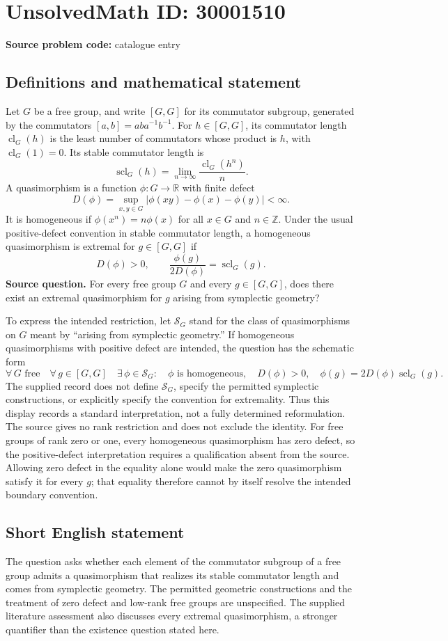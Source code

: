 \documentclass[11pt]{article}
\newcommand{\Z}{\mathbb{Z}}
\newcommand{\R}{\mathbb{R}}
\begin{document}
\section*{UnsolvedMath ID: 30001510}
\textbf{Source problem code:} catalogue entry
\subsection{Definitions and mathematical statement}
Let \(G\) be a free group, and write \([G,G]\) for its commutator subgroup, generated by the commutators \([a,b]=aba^{-1}b^{-1}\). For \(h\in[G,G]\), its commutator length \(\operatorname{cl}_G(h)\) is the least number of commutators whose product is \(h\), with \(\operatorname{cl}_G(1)=0\). Its stable commutator length is
\[
\operatorname{scl}_G(h)=\lim_{n\to\infty}\frac{\operatorname{cl}_G(h^n)}{n}.
\]
A quasimorphism is a function \(\phi:G\to\R\) with finite defect
\[
D(\phi)=\sup_{x,y\in G}|\phi(xy)-\phi(x)-\phi(y)|<\infty.
\]
It is homogeneous if \(\phi(x^n)=n\phi(x)\) for all \(x\in G\) and \(n\in\Z\). Under the usual positive-defect convention in stable commutator length, a homogeneous quasimorphism is extremal for \(g\in[G,G]\) if
\[
D(\phi)>0,\qquad \frac{\phi(g)}{2D(\phi)}=\operatorname{scl}_G(g).
\]
\textbf{Source question.} For every free group \(G\) and every \(g\in[G,G]\), does there exist an extremal quasimorphism for \(g\) arising from symplectic geometry?

To express the intended restriction, let \(\mathcal S_G\) stand for the class of quasimorphisms on \(G\) meant by ``arising from symplectic geometry.'' If homogeneous quasimorphisms with positive defect are intended, the question has the schematic form
\[
\forall\,G\text{ free}\quad\forall\,g\in[G,G]\quad
\exists\,\phi\in\mathcal S_G:\quad
\phi\text{ is homogeneous},\quad D(\phi)>0,\quad
\phi(g)=2D(\phi)\operatorname{scl}_G(g).
\]
The supplied record does not define \(\mathcal S_G\), specify the permitted symplectic constructions, or explicitly specify the convention for extremality. Thus this display records a standard interpretation, not a fully determined reformulation. The source gives no rank restriction and does not exclude the identity. For free groups of rank zero or one, every homogeneous quasimorphism has zero defect, so the positive-defect interpretation requires a qualification absent from the source. Allowing zero defect in the equality alone would make the zero quasimorphism satisfy it for every \(g\); that equality therefore cannot by itself resolve the intended boundary convention.
\subsection{Short English statement}
The question asks whether each element of the commutator subgroup of a free group admits a quasimorphism that realizes its stable commutator length and comes from symplectic geometry. The permitted geometric constructions and the treatment of zero defect and low-rank free groups are unspecified. The supplied literature assessment also discusses every extremal quasimorphism, a stronger quantifier than the existence question stated here.
\end{document}
